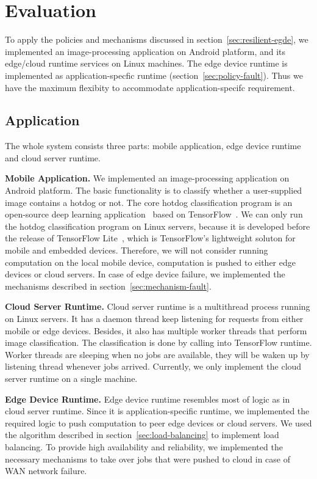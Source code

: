 \section{Evaluation}
\label{sec:evaluation}

To apply the policies and mechanisms discussed in section~\ref{sec:resilient-egde},
we implemented an image-processing application on Android platform, and its edge/cloud runtime services on Linux machines.
The edge device runtime is implemented as application-specfic runtime (section~\ref{sec:policy-fault}).
Thus we have the maximum flexibity to accommodate application-specifc requirement.

\subsection{Application}
\label{sec:eval-app}

The whole system consists three parts: mobile application, edge device runtime and cloud server runtime.

\hfill\break
\noindent \textbf{Mobile Application.}
We implemented an image-processing application on Android platform. The basic functionality is to classify
whether a user-supplied image contains a hotdog or not. The core hotdog classification program is an open-source
deep learning application~\cite{url:hotdog-classification} based on TensorFlow~\cite{tensorflow-osdi}.
We can only run the hotdog classification program on Linux servers, because it is developed before the
release of TensorFlow Lite~\cite{url:tensorflow-lite}, which is TensorFlow's lightweight soluton for mobile and embedded devices.
Therefore, we will not consider running computation on the local mobile device, computation is pushed to either
edge devices or cloud servers.
In case of edge device failure, we implemented the mechanisms described in section~\ref{sec:mechanism-fault}.

\hfill\break
\noindent \textbf{Cloud Server Runtime.}
Cloud server runtime is a multithread process running on Linux servers.
It has a daemon thread keep listening for requests from either mobile or edge devices.
Besides, it also has multiple worker threads that perform image classification.
The classification is done by calling into TensorFlow runtime. Worker threads
are sleeping when no jobs are available, they will be waken up by listening thread whenever jobs arrived.
Currently, we only implement the cloud server runtime on a single machine.

\hfill\break
\noindent \textbf{Edge Device Runtime.}
Edge device runtime resembles most of logic as in cloud server runtime.
Since it is application-specific runtime, we implemented the required logic to push computation
to peer edge devices or cloud servers. We used the algorithm described in section~\ref{sec:load-balancing}
to implement load balancing. To provide high availability and reliability, we implemented the necessary
mechanisms to take over jobs that were pushed to cloud in case of WAN network failure.

